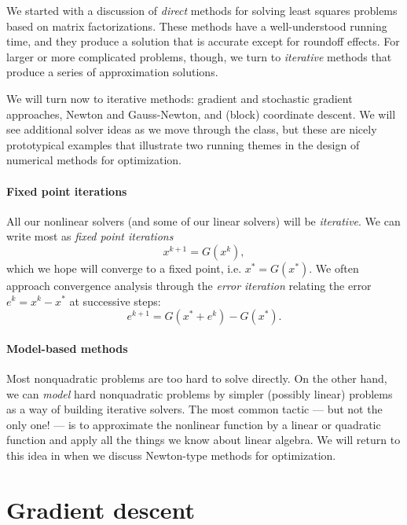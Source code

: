 \documentclass[12pt, leqno]{article} %
\begin{document}
We started with a discussion of {\em direct} methods
for solving least squares problems based on matrix factorizations.
These methods have a well-understood running time, and they produce
a solution that is accurate except for roundoff effects.  For larger
or more complicated problems, though, we turn to
{\em iterative} methods that produce a series of approximation
solutions.

We will turn now to iterative methods: gradient and stochastic
gradient approaches, Newton and Gauss-Newton, and (block) coordinate
descent.  We will see additional solver ideas as we move through the
class, but these are nicely prototypical examples that illustrate
two running themes in the design of numerical methods for
optimization.

\paragraph{Fixed point iterations}
All our nonlinear solvers (and some of our linear solvers) will be
{\em iterative}.  We can write most as {\em fixed point iterations}
\begin{equation}
  x^{k+1} = G(x^k), \label{eq:fixed-point}
\end{equation}
which we hope will converge to a fixed point, i.e. $x^* = G(x^*)$.
We often approach convergence analysis through the
{\em error iteration} relating the error $e^k = x^k-x^*$ at
successive steps:
\begin{equation}
  e^{k+1} = G(x^* + e^k)-G(x^*).
\end{equation}

\paragraph{Model-based methods}
Most nonquadratic problems are too hard to solve directly.  On the other
hand, we can {\em model} hard nonquadratic problems by simpler (possibly
linear) problems as a way of building iterative solvers.  The most
common tactic --- but not the only one! --- is to approximate the
nonlinear function by a linear or quadratic function and apply all the
things we know about linear algebra.  We will return to this idea in
when we discuss Newton-type methods for optimization.

\section{Gradient descent}
\end{document}

